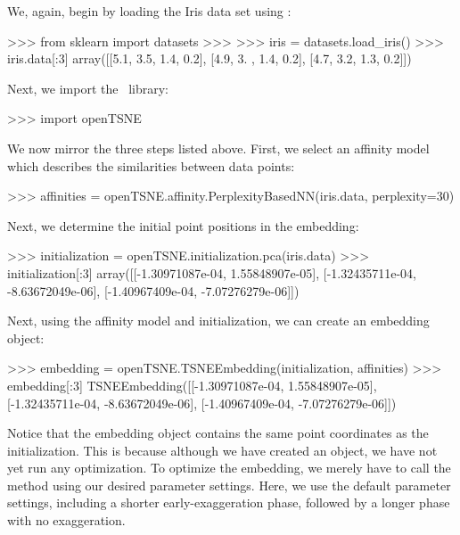 \documentclass[article]{jss}
\newcommand{\opentsne}{\pkg{openTSNE}}
\begin{document}
We, again, begin by loading the Iris data set using :
\begin{CodeChunk}
\begin{CodeInput}
>>> from sklearn import datasets
>>>
>>> iris = datasets.load_iris()
>>> iris.data[:3]
array([[5.1, 3.5, 1.4, 0.2],
       [4.9, 3. , 1.4, 0.2],
       [4.7, 3.2, 1.3, 0.2]])
\end{CodeInput}
\end{CodeChunk}
Next, we import the \opentsne\ library:
\begin{CodeChunk}
\begin{CodeInput}
>>> import openTSNE
\end{CodeInput}
\end{CodeChunk}
We now mirror the three steps listed above. First, we select an affinity model which describes the similarities between data points:
\begin{CodeChunk}
\begin{CodeInput}
>>> affinities = openTSNE.affinity.PerplexityBasedNN(iris.data, perplexity=30)
\end{CodeInput}
\end{CodeChunk}
Next, we determine the initial point positions in the embedding:
\begin{CodeChunk}
\begin{CodeInput}
>>> initialization = openTSNE.initialization.pca(iris.data)
>>> initialization[:3]
array([[-1.30971087e-04,  1.55848907e-05],
       [-1.32435711e-04, -8.63672049e-06],
       [-1.40967409e-04, -7.07276279e-06]])
\end{CodeInput}
\end{CodeChunk}
Next, using the affinity model and initialization, we can create an embedding object:
\begin{CodeChunk}
\begin{CodeInput}
>>> embedding = openTSNE.TSNEEmbedding(initialization, affinities)
>>> embedding[:3]
TSNEEmbedding([[-1.30971087e-04,  1.55848907e-05],
               [-1.32435711e-04, -8.63672049e-06],
               [-1.40967409e-04, -7.07276279e-06]])
\end{CodeInput}
\end{CodeChunk}
Notice that the embedding object contains the same point coordinates as the initialization. This is because although we have created an  object, we have not yet run any optimization. To optimize the embedding, we merely have to call the  method using our desired parameter settings. Here, we use the default parameter settings, including a shorter early-exaggeration phase, followed by a longer phase with no exaggeration.
\end{document}
